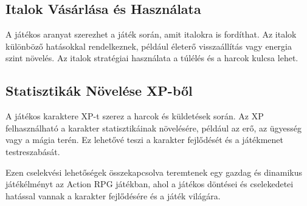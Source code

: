 \subsection{Italok Vásárlása és Használata}

A játékos aranyat szerezhet a játék során, amit italokra is fordíthat. Az italok különböző hatásokkal rendelkeznek, például életerő visszaállítás vagy energia szint növelés. Az italok stratégiai használata a túlélés és a harcok kulcsa lehet.

\subsection{Statisztikák Növelése XP-ből}

A játékos karaktere XP-t szerez a harcok és küldetések során. Az XP felhasználható a karakter statisztikáinak növelésére, például az erő, az ügyesség vagy a mágia terén. Ez lehetővé teszi a karakter fejlődését és a játékmenet testreszabását.

Ezen cselekvési lehetőségek összekapcsolva teremtenek egy gazdag és dinamikus játékélményt az Action RPG játékban, ahol a játékos döntései és cselekedetei hatással vannak a karakter fejlődésére és a játék világára.



